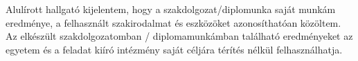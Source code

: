 Alulírott hallgató kijelentem, hogy a szakdolgozat/diplomunka saját munkám eredménye, a felhasznált szakirodalmat és eszközöket azonosíthatóan közöltem. Az elkészült szakdolgozatomban / diplomamunkámban található eredményeket az egyetem és a feladat kiíró intézmény saját céljára térítés nélkül felhasználhatja.